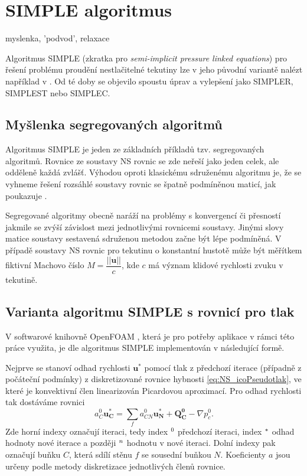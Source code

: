\section{SIMPLE algoritmus}


myslenka, 'podvod', relaxace

Algoritmus SIMPLE (zkratka pro \textit{semi-implicit pressure linked equations}) pro řešení problému proudění nestlačitelné tekutiny lze v jeho původní variantě nalézt například v \cite{patankar1983calculation}. Od té doby se objevilo spoustu úprav a vylepšení jako SIMPLER, SIMPLEST nebo SIMPLEC. 

\subsection{Myšlenka segregovaných algoritmů}
Algoritmus SIMPLE je jeden ze základních příkladů tzv. segregovaných algoritmů. Rovnice ze soustavy NS rovnic se zde neřeší jako jeden celek, ale odděleně každá zvlášť. Výhodou oproti klasickému sdruženému algoritmu je, že se vyhneme řešení rozsáhlé soustavy rovnic se špatně podmíněnou maticí, jak poukazuje \cite{furst2020mko2}. 

Segregované algoritmy obecně naráží na problémy s konvergencí či přesností jakmile se zvýší závislost mezi jednotlivými rovnicemi soustavy. Jinými slovy matice soustavy sestavená sdruženou metodou začne být lépe podmíněná. V případě soustavy NS rovnic pro tekutinu o konstantní hustotě může být měřítkem fiktivní Machovo číslo $ M = \dfrac{||\mathbf{u}||}{c} $, kde $ c $ má význam klidové rychlosti zvuku v tekutině.

\subsection{Varianta algoritmu SIMPLE s rovnicí pro tlak}
V softwarové knihovně OpenFOAM \cite{weller1998tensorial}, která je pro potřeby aplikace v rámci této práce využita, je dle \cite{furst2020mko2} algoritmus SIMPLE implementován v následující formě. 

Nejprve se stanoví odhad rychlosti $ \mathbf{u}^* $ pomocí tlak z předchozí iterace (případně z počáteční podmínky) z diskretizované rovnice hybnosti \ref{eq:NS_icoPseudotlak}, ve které je konvektivní člen linearizován Picardovou aproximací. Pro odhad rychlosti tak dostáváme rovnici
\begin{equation}
a_C^0\mathbf{u_C^*}
=
\sum_f a_{CN}^0 \mathbf{u_N^*}+\mathbf{Q_C^0}-\nabla p_c^0.
\end{equation}
Zde horní indexy označují iteraci, tedy index $ \null^0 $ předchozí iteraci, index $ \null^* $ odhad hodnoty nové iterace a později $ \null^n $ hodnotu v nové iteraci. Dolní indexy pak označují buňku $ C $, která sdílí stěnu $ f $ se sousední buňkou $ N $. Koeficienty $ a $ jsou určeny podle metody diskretizace jednotlivých členů rovnice.

